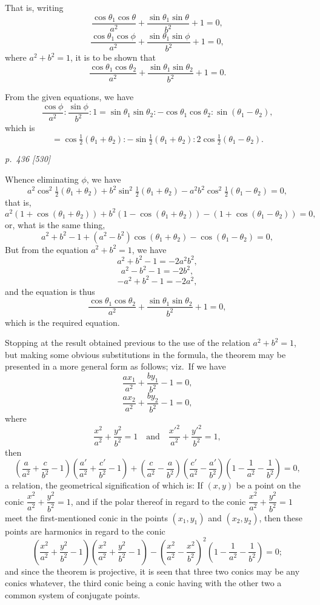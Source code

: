 \documentclass[11pt,a4paper]{article}
\theoremstyle{plain}
\theoremstyle{definition}
\begin{document}
That is, writing
\[
\frac{\cos\theta_1\cos\theta}{a^2} + \frac{\sin\theta_1\sin\theta}{b^2} + 1 = 0,
\]
\[
\frac{\cos\theta_1\cos\phi}{a^2} + \frac{\sin\theta_1\sin\phi}{b^2} + 1 = 0,
\]
where $a^2 + b^2 = 1$, it is to be shown that
\[
\frac{\cos\theta_1\cos\theta_2}{a^2} + \frac{\sin\theta_1\sin\theta_2}{b^2} + 1 = 0.
\]

From the given equations, we have
\[
\frac{\cos\phi}{a^2}:\frac{\sin\phi}{b^2}:1 = \sin\theta_1\sin\theta_2:-\cos\theta_1\cos\theta_2:\sin(\theta_1 - \theta_2),
\]
which is
\[
= \cos\tfrac{1}{2}(\theta_1 + \theta_2):-\sin\tfrac{1}{2}(\theta_1 + \theta_2):2\cos\tfrac{1}{2}(\theta_1 - \theta_2).
\]

\clearpage

\bigskip
\textit{p.~436 [530]}
\smallskip

Whence eliminating $\phi$, we have
\[
a^2\cos^2\tfrac{1}{2}(\theta_1 + \theta_2) + b^2\sin^2\tfrac{1}{2}(\theta_1 + \theta_2) - a^2 b^2\cos^2\tfrac{1}{2}(\theta_1 - \theta_2) = 0,
\]
that is,
\[
a^2(1 + \cos(\theta_1 + \theta_2)) + b^2(1 - \cos(\theta_1 + \theta_2)) - (1 + \cos(\theta_1 - \theta_2)) = 0,
\]
or, what is the same thing,
\[
a^2 + b^2 - 1 + (a^2 - b^2)\cos(\theta_1 + \theta_2) - \cos(\theta_1 - \theta_2) = 0,
\]
But from the equation $a^2 + b^2 = 1$, we have
\[
a^2 + b^2 - 1 = - 2a^2 b^2,
\]
\[
a^2 - b^2 - 1 = - 2b^2,
\]
\[
- a^2 + b^2 - 1 = - 2a^2,
\]
and the equation is thus
\[
\frac{\cos\theta_1\cos\theta_2}{a^2} + \frac{\sin\theta_1\sin\theta_2}{b^2} + 1 = 0,
\]
which is the required equation.

Stopping at the result obtained previous to the use of the relation $a^2 + b^2 = 1$,
but making some obvious substitutions in the formula, the theorem may be presented in
a more general form as follows; viz.\
If we have
\[
\frac{ax_1}{a^2} + \frac{by_1}{b^2} - 1 = 0,
\]
\[
\frac{ax_2}{a^2} + \frac{by_2}{b^2} - 1 = 0,
\]
where
\[
\frac{x^2}{a^2} + \frac{y^2}{b^2} = 1 \quad \text{and}\quad \frac{x'^2}{a^2} + \frac{y'^2}{b^2} = 1,
\]
then
\[
\left(\frac{a}{a^2} + \frac{c}{b^2} - 1\right)\left(\frac{a'}{a^2} + \frac{c'}{b^2} - 1\right) + \left(\frac{c}{a^2} - \frac{a}{b^2}\right)\left(\frac{c'}{a^2} - \frac{a'}{b^2}\right)\left(1 - \frac{1}{a^2} - \frac{1}{b^2}\right) = 0,
\]
a relation, the geometrical signification of which is: If $(x, y)$ be a point on the conic
$\dfrac{x^2}{a^2} + \dfrac{y^2}{b^2} = 1$, and if the polar thereof in regard to the conic $\dfrac{x^2}{a^2} + \dfrac{y^2}{b^2} = 1$ meet the
first-mentioned conic in the points $(x_1, y_1)$ and $(x_2, y_2)$, then these points are harmonics
in regard to the conic
\[
\left(\frac{x^2}{a^2} + \frac{y^2}{b^2} - 1\right)\left(\frac{x^2}{a^2} + \frac{y^2}{b^2} - 1\right) - \left(\frac{x^2}{a^2} - \frac{x^2}{b^2}\right)^2 \left(1 - \frac{1}{a^2} - \frac{1}{b^2}\right) = 0;
\]
and since the theorem is projective, it is seen that three two conics may be any
conics whatever, the third conic being a conic having with the other two a common
system of conjugate points.
\end{document}
